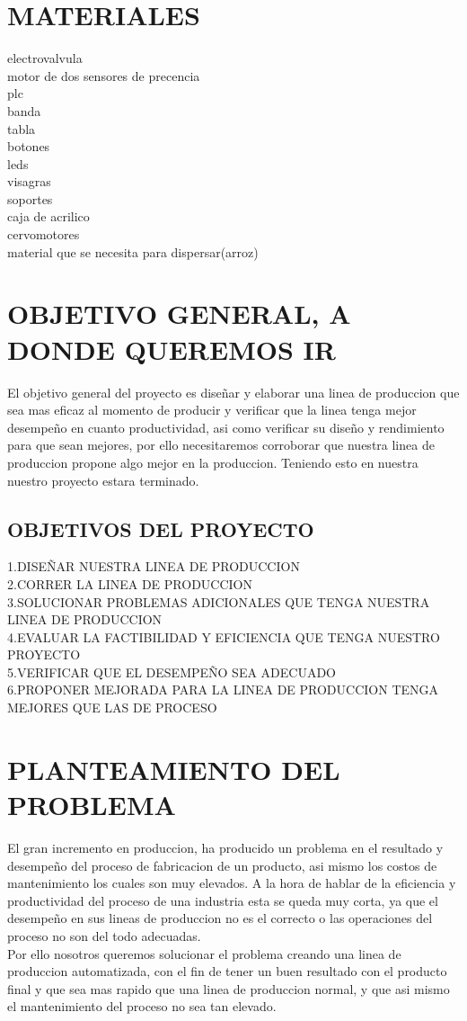 \documentclass[11pt,a4paper]{article}
\begin{document}
\section{MATERIALES}
electrovalvula\\motor de dos sensores de precencia\\plc\\banda\\tabla\\botones\\leds\\visagras\\soportes\\caja de acrilico\\cervomotores\\material que se necesita para dispersar(arroz)
\\
\section{OBJETIVO GENERAL, A DONDE QUEREMOS IR}
El objetivo general del proyecto es dise\~nar y elaborar una linea de produccion que sea mas eficaz
al momento de producir y verificar que la linea tenga mejor desempe\~no en cuanto productividad,
asi como verificar su dise\~no y rendimiento para que sean mejores, por ello necesitaremos
corroborar que nuestra linea de produccion propone algo mejor en la produccion. Teniendo esto
en nuestra nuestro proyecto estara terminado.
\subsection{OBJETIVOS DEL PROYECTO}
1.DISE\~NAR NUESTRA LINEA DE PRODUCCION\\2.CORRER LA LINEA DE PRODUCCION\\3.SOLUCIONAR PROBLEMAS ADICIONALES QUE TENGA NUESTRA LINEA DE PRODUCCION\\4.EVALUAR LA FACTIBILIDAD Y EFICIENCIA QUE TENGA NUESTRO PROYECTO\\5.VERIFICAR QUE EL DESEMPE\~NO SEA ADECUADO\\6.PROPONER MEJORADA PARA LA LINEA DE PRODUCCION TENGA MEJORES QUE LAS DE PROCESO 
\newpage
\section{PLANTEAMIENTO DEL PROBLEMA}
El gran incremento en produccion, ha producido un problema en el resultado y desempe\~no del
proceso de fabricacion de un producto, asi mismo los costos de mantenimiento los cuales son muy
elevados. A la hora de hablar de la eficiencia y productividad del proceso de una industria esta se
queda muy corta, ya que el desempe\~no en sus lineas de produccion no es el correcto o las
operaciones del proceso no son del todo adecuadas.\\Por ello nosotros queremos solucionar el problema creando una linea de produccion
automatizada, con el fin de tener un buen resultado con el producto final y que sea mas rapido
que una linea de produccion normal, y que asi mismo el mantenimiento del proceso no sea tan
elevado.
\\
\end{document}
